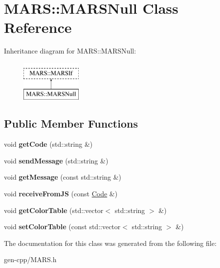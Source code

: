 \hypertarget{classMARS_1_1MARSNull}{}\section{M\+A\+RS\+:\+:M\+A\+R\+S\+Null Class Reference}
\label{classMARS_1_1MARSNull}
Inheritance diagram for M\+A\+RS\+:\+:M\+A\+R\+S\+Null\+:\begin{figure}[H]
\begin{center}
\leavevmode
\includegraphics[height=2.000000cm]{classMARS_1_1MARSNull}
\end{center}
\end{figure}
\subsection*{Public Member Functions}
\begin{DoxyCompactItemize}
\item 
\mbox{\label{classMARS_1_1MARSNull_a757644eb0ec614640b91ae07acb6e03c}} 
void {\bfseries get\+Code} (std\+::string \&)
\item 
\mbox{\label{classMARS_1_1MARSNull_a6def929cab98e11050cfb18ddfe5c931}} 
void {\bfseries send\+Message} (std\+::string \&)
\item 
\mbox{\label{classMARS_1_1MARSNull_ad190c9cacc0f2267e4e76400f2d4e150}} 
void {\bfseries get\+Message} (const std\+::string \&)
\item 
\mbox{\label{classMARS_1_1MARSNull_a55c02ba9310b54697619632fa6d5ce7e}} 
void {\bfseries receive\+From\+JS} (const \hyperlink{classMARS_1_1Code}{Code} \&)
\item 
\mbox{\label{classMARS_1_1MARSNull_a313820c47569b0e7ae1c25893c663736}} 
void {\bfseries get\+Color\+Table} (std\+::vector$<$ std\+::string $>$ \&)
\item 
\mbox{\label{classMARS_1_1MARSNull_a35161e7232caef70ec72471e62c6861d}} 
void {\bfseries set\+Color\+Table} (const std\+::vector$<$ std\+::string $>$ \&)
\end{DoxyCompactItemize}


The documentation for this class was generated from the following file\+:\begin{DoxyCompactItemize}
\item 
gen-\/cpp/M\+A\+R\+S.\+h\end{DoxyCompactItemize}
